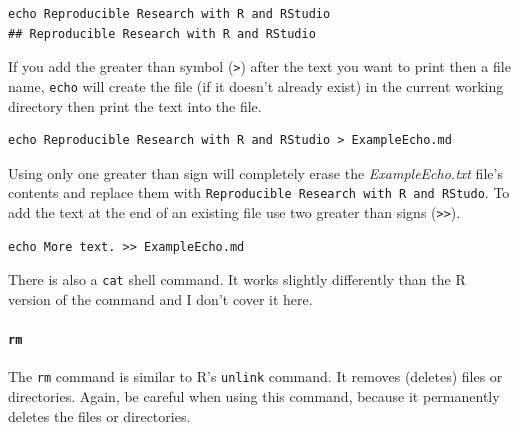\documentclass[krantz1]{krantz}
\begin{document}
\begin{knitrout}
\color{fgcolor}\begin{kframe}
\begin{verbatim}
echo Reproducible Research with R and RStudio
## Reproducible Research with R and RStudio
\end{verbatim}
\end{kframe}
\end{knitrout}


\noindent If you add the greater than symbol (\verb|>|) after the text you want to print then a file name, \texttt{echo} will create the file (if it doesn't already exist) in the current working directory then print the text into the file.

\begin{knitrout}
\color{fgcolor}\begin{kframe}
\begin{verbatim}
echo Reproducible Research with R and RStudio > ExampleEcho.md
\end{verbatim}
\end{kframe}
\end{knitrout}


\noindent Using only one greater than sign will completely erase the \emph{ExampleEcho.txt} file's contents and replace them with \texttt{Reproducible Research with R and RStudo}. To add the text at the end of an existing file use two greater than signs (\verb|>>|).

\begin{knitrout}
\color{fgcolor}\begin{kframe}
\begin{verbatim}
echo More text. >> ExampleEcho.md
\end{verbatim}
\end{kframe}
\end{knitrout}


\noindent There is also a \texttt{cat} shell command. It works slightly differently than the R version of the command and I don't cover it here.

\paragraph{{\tt{rm}}}

The {\tt{rm}} command is similar to R's {\tt{unlink}} command. It removes (deletes) files or directories. Again, be careful when using this command, because it permanently deletes the files or directories.
\end{document}
